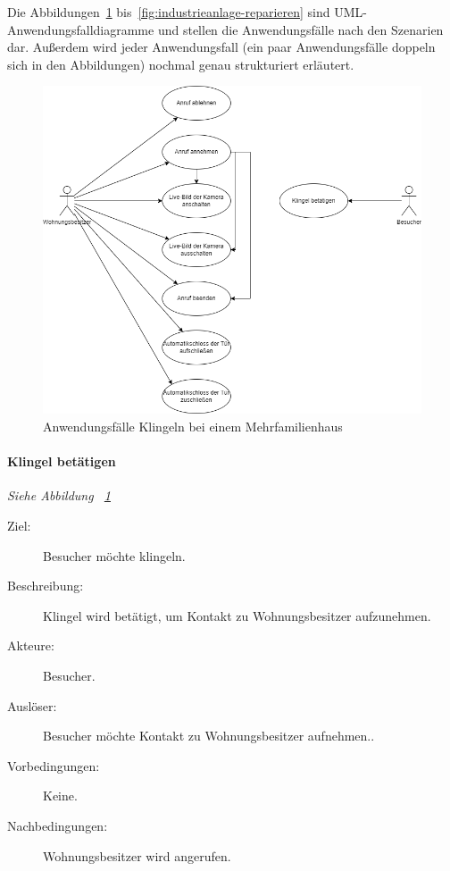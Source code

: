 Die Abbildungen~\ref{fig:klingeln-bei-einem-mehrfamilienhaus} bis~\ref{fig:industrieanlage-reparieren} sind UML-Anwendungsfalldiagramme und stellen die Anwendungsfälle nach den Szenarien dar.
Außerdem wird jeder Anwendungsfall (ein paar Anwendungsfälle doppeln sich in den Abbildungen) nochmal genau strukturiert erläutert.

\begin{figure}[ht!]
    \centering
    \includegraphics[width=\paperwidth-2in]{../assets/img/UML-Anwendungsfalldiagramme-Klingeln bei einem Mehrfamilienhaus}
    \caption{Anwendungsfälle Klingeln bei einem Mehrfamilienhaus}
    \label{fig:klingeln-bei-einem-mehrfamilienhaus}
\end{figure}

\paragraph{\large{Klingel betätigen}}
\textit{Siehe Abbildung ~\ref{fig:klingeln-bei-einem-mehrfamilienhaus}}
    \begin{description}
        \item[Ziel:] Besucher möchte klingeln.
        \item[Beschreibung:] Klingel wird betätigt, um Kontakt zu Wohnungsbesitzer aufzunehmen.
        \item[Akteure:] Besucher.
        \item[Auslöser:] Besucher möchte Kontakt zu Wohnungsbesitzer aufnehmen..
        \item[Vorbedingungen:] Keine.
        \item[Nachbedingungen:] Wohnungsbesitzer wird angerufen.
    \end{description}

